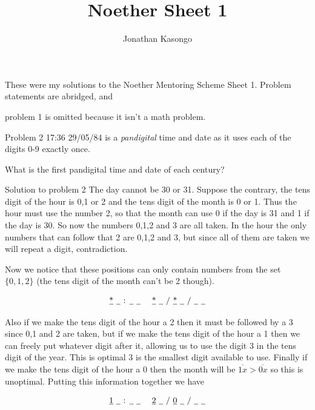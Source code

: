 \documentclass{article}
\author{Jonathan Kasongo}
\title{Noether Sheet 1}
\begin{document}
\maketitle

\noindent
These were my solutions to the Noether Mentoring Scheme Sheet 1.
Problem statements are abridged, and
\centerline{problem 1 is omitted because it isn't
a math problem.}

\begin{problem}{Problem 2}
17:36 29/05/84 is a \textit{pandigital} time and date as it uses each of
the digits 0-9 exactly once. \vspace{0.2cm}

What is the first pandigital time and date of each century?
\end{problem}

\begin{solution}{Solution to problem 2}
The day cannot be 30 or 31. Suppose the contrary, the tens digit of the
hour is 0,1 or 2 and the tens digit of the month is 0 or 1. Thus the
hour must use the number 2, so that the month can use 0 if the day is 31 and
1 if the day is 30. So now the numbers 0,1,2 and 3 are all taken. In the
hour the only numbers that can follow that 2 are 0,1,2 and 3, but since all
of them are taken we will repeat a digit, contradiction.
\vspace{0.2cm}

Now we notice that these positions can only contain numbers from the set
$\{0, 1, 2\}$ (the tens digit of the month can't be 2 though).

\large
$$
\text{
\underline{*} \underline{\phantom{a}} : \underline{\phantom{a}} \underline{\phantom{a}} \ \ \
\underline{*} \underline{\phantom{a}} / \underline{*} \underline{\phantom{a}} / \underline{\phantom{a}} \underline{\phantom{a}}
}
$$

\normalsize
Also if we make the tens digit of the hour a 2 then it must be followed by
a 3 since 0,1 and 2 are taken, but if we make the tens digit of the hour a
1 then we can freely put whatever digit after it, allowing us to use
the digit 3 in the tens digit of the year.
This is optimal 3 is the smallest digit available to use.
Finally if we make the tens digit of the hour a 0 then the month will be
$\overline{1x} > \overline{0x}$ so this is unoptimal. Putting this
information together we have

\large
$$
\text{
\underline{1} \underline{\phantom{a}} : \underline{\phantom{a}} \underline{\phantom{a}} \ \ \
\underline{2} \underline{\phantom{a}} / \underline{0} \underline{\phantom{a}} / \underline{\phantom{a}} \underline{\phantom{a}}
}
$$
\normalsize


\end{solution}
\end{document}
